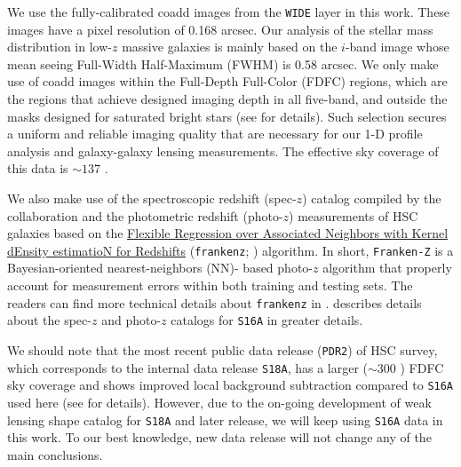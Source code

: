 \documentclass[a4paper,fleqn,usenatbib]{mnras}
\begin{document}
    We use the fully-calibrated coadd images from the \texttt{WIDE} layer in this work.
    These images have a pixel resolution of 0.168 arcsec. 
    Our analysis of the stellar mass distribution in low-$z$ massive galaxies is mainly based on 
    the $i$-band image whose mean seeing Full-Width Half-Maximum (FWHM) is 0.58 arcsec.
    We only make use of coadd images within the Full-Depth Full-Color (FDFC) regions, which 
    are the regions that achieve designed imaging depth in all five-band, and outside the masks
    designed for saturated bright stars (see \citealt{HSC-STAR} for details). 
    Such selection secures a uniform and reliable imaging quality that are necessary for 
    our 1-D profile analysis and galaxy-galaxy lensing measurements.
    The effective sky coverage of this data is $\sim 137$ \sqdeg{}.

    We also make use of the spectroscopic redshift (spec-$z$) catalog compiled by the collaboration 
    and the photometric redshift (photo-$z$) measurements of HSC galaxies based on the  
    \href{https://github.com/joshspeagle/frankenz}{Flexible Regression over Associated Neighbors
    with Kernel dEnsity estimatioN for Redshifts} (\texttt{frankenz}; \citealt{Speagle2019})
    algorithm.
    In short, \texttt{Franken-Z} is a Bayesian-oriented nearest-neighbors (NN)- based photo-$z$
    algorithm that properly account for measurement errors within both training and testing sets.
    The readers can find more technical details about \texttt{frankenz} in \citet{Speagle2019}.
    \citet{HSC-PHOTOZ} describes details about the spec-$z$ and photo-$z$ catalogs for \texttt{S16A}
    in greater details.

    We should note that the most recent public data release (\texttt{PDR2}) of HSC survey, which 
    corresponds to the internal data release \texttt{S18A}, has a larger ($\sim 300$ \sqdeg{}) FDFC 
    sky coverage and shows improved local background subtraction compared to \texttt{S16A} used here
    (see \citealt{HSC-DR2} for details).
    However, due to the on-going development of weak lensing shape catalog for \texttt{S18A} and 
    later release, we will keep using \texttt{S16A} data in this work.
    To our best knowledge, new data release will not change any of the main conclusions.

\end{document}
